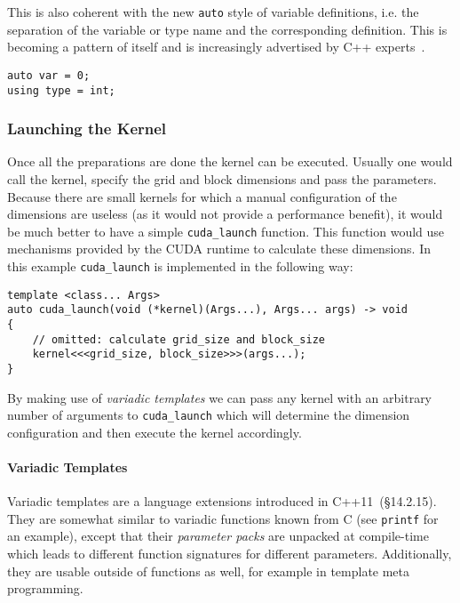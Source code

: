 This is also coherent with the new \texttt{auto} style of variable definitions, i.e. the separation of the variable or type name and the corresponding definition. This is becoming a pattern of itself and is increasingly advertised by C++ experts~\cite{sutter_cppcon}.

\begin{verbatim}
auto var = 0;
using type = int;
\end{verbatim}

\subsubsection{Launching the Kernel}\label{modern:vec_add:kernel_launch}

Once all the preparations are done the kernel can be executed. Usually one would call the kernel, specify the grid and block dimensions and pass the parameters. Because there are small kernels for which a manual configuration of the dimensions are useless (as it would not provide a performance benefit), it would be much better to have a simple \texttt{cuda\_launch} function. This function would use mechanisms provided by the CUDA runtime to calculate these dimensions. In this example \texttt{cuda\_launch} is implemented in the following way:

\begin{verbatim}
template <class... Args>
auto cuda_launch(void (*kernel)(Args...), Args... args) -> void
{
    // omitted: calculate grid_size and block_size
    kernel<<<grid_size, block_size>>>(args...);
}
\end{verbatim}

\noindent By making use of \textit{variadic templates} we can pass any kernel with an arbitrary number of arguments to \texttt{cuda\_launch} which will determine the dimension configuration and then execute the kernel accordingly.

\paragraph{Variadic Templates}

Variadic templates are a language extensions introduced in C++11~\cite{cpp11std}(§14.2.15). They are somewhat similar to variadic functions known from C (see \texttt{printf} for an example), except that their \textit{parameter packs} are unpacked at compile-time which leads to different function signatures for different parameters. Additionally, they are usable outside of functions as well, for example in template meta programming.

